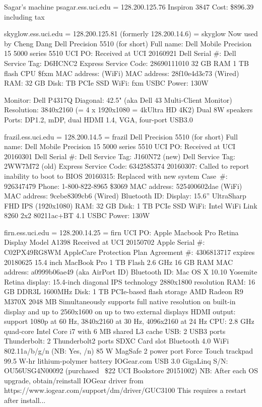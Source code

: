 \documentclass[12pt,twoside]{article}
\begin{document}
Sagar's machine
psagar.ess.uci.edu = 128.200.125.76
Inspiron 3847
Cost: \$896.39 including tax

skyglow.ess.uci.edu = 128.200.125.81 (formerly 128.200.14.6) = skyglow
Now used by Cheng Dang
Dell Precision 5510 (for short)
Full name: Dell Mobile Precision 15 5000 series 5510
UCI PO: 
Received at UCI 20160921
Dell Serial \#: 
Dell Service Tag: D6HCNC2
Express Service Code: 28690111010
32 GB RAM
1 TB flash
CPU 
\$fxm
MAC address:  (WiFi)
MAC address: 28f10e4d3c73 (Wired)
RAM: 32 GB 
Disk:  TB PCIe SSD
WiFi: fxm
USBC
Power: 130W

Monitor: Dell P4317Q
Diagonal: 42.5" (aka Dell 43 Multi-Client Monitor)
Resolution: 3840x2160 (= 4 x 1920x1080 = 4kUltra HD 4K2)
Dual 8W speakers
Ports: DP1.2, mDP, dual HDMI 1.4, VGA, four-port USB3.0

frazil.ess.uci.edu = 128.200.14.5 = frazil
Dell Precision 5510 (for short)
Full name: Dell Mobile Precision 15 5000 series 5510
UCI PO: 
Received at UCI 20160301
Dell Serial \#: 
Dell Service Tag: J160N72 (new)
Dell Service Tag: 2WW7M72 (old)
Express Service Code: 6342585374
20160307: Called to report inability to boot to BIOS
20160315: Replaced with new system
Case~\#: 926347479
Phone: 1-800-822-8965
\$3069
MAC address: 525400602dae (WiFi)
MAC address: 9cebe8309cb6 (Wired)
Bluetooth ID: 
Display: 15.6'' UltraSharp FHD IPS (1920x1080) 
RAM: 32 GB 
Disk: 1 TB PCIe SSD
WiFi: Intel WiFi Link 8260 2x2 80211ac+BT 4.1
USBC
Power: 130W

firn.ess.uci.edu = 128.200.14.25 = firn
UCI PO: 
Apple Macbook Pro Retina Display
Model A1398
Received at UCI 20150702
Apple Serial \#: C02PX49RG8WM
AppleCare Protection Plan Agreement \#: 4306813717 expires 20180625
15.4 inch MacBook Pro
1 TB Flash
2.6 GHz
16 GB RAM
MAC address: a0999b06ae49 (aka AirPort ID)
Bluetooth ID: 
Mac OS X 10.10 Yosemite
Retina display: 15.4-inch diagonal
IPS technology 2880x1800 resolution
RAM: 16 GB DDR3L 1600MHz
Disk: 1 TB PCIe-based flash storage
AMD Radeon R9 M370X 2048 MB
Simultaneously supports full native resolution on built-in display and up to 2560x1600 on up to two external displays
HDMI output: support 1080p at 60 Hz, 3840x2160 at 30 Hz, 4096x2160 at 24 Hz
CPU: 2.8 GHz quad-core Intel Core i7 with 6 MB shared L3 cache
USB: 2 USB3 ports
Thunderbolt: 2 Thunderbolt2 ports
SDXC Card slot
Bluetooth 4.0
WiFi 802.11a/b/g/n (NB: Yes, /n)
85 W MagSafe 2 power port
Force Touch trackpad
99.5 W-hr lithium-polymer battery
IOGear.com USB 3.0 GigaLinq S/N: OU56USG4N00092 (purchased ~\$22 UCI Bookstore 20151002)
NB: After each OS upgrade, obtain/reinstall IOGear driver from
https://www.iogear.com/support/dm/driver/GUC3100
This requires a restart after install...
\end{document}
